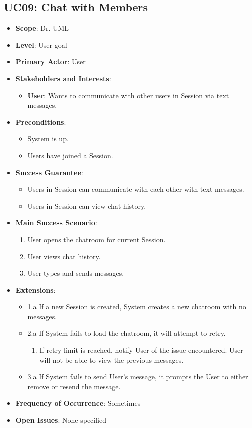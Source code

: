 \documentclass[12pt]{article}
\begin{document}
\subsection{UC09: Chat with Members}
\begin{itemize}
    \item \textbf{Scope}: Dr. UML
    \item \textbf{Level}: User goal
    \item \textbf{Primary Actor}: User
    \item \textbf{Stakeholders and Interests}:
    \begin{itemize}
        \item \textbf{User}: Wants to communicate with other users in Session via text messages.
    \end{itemize}
    \item \textbf{Preconditions}:
    \begin{itemize}
        \item System is up.
        \item Users have joined a Session.
    \end{itemize}
    \item \textbf{Success Guarantee}:
    \begin{itemize}
        \item Users in Session can communicate with each other with text messages.
        \item Users in Session can view chat history.
    \end{itemize}
    \item \textbf{Main Success Scenario}:
    \begin{enumerate}
        \item User opens the chatroom for current Session.
        \item User views chat history.
        \item User types and sends messages.
    \end{enumerate}
    \item \textbf{Extensions}:
    \begin{itemize}
        \item 1.a If a new Session is created, System creates a new chatroom with no messages.
        \item 2.a If System fails to load the chatroom, it will attempt to retry.
        \begin{enumerate}
            \item If retry limit is reached, notify User of the issue encountered. User will not be able to view the previous messages.
        \end{enumerate}
        \item 3.a If System fails to send User's message, it prompts the User to either remove or resend the message.
    \end{itemize}
    \item \textbf{Frequency of Occurrence}: Sometimes
    \item \textbf{Open Issues}: None specified
\end{itemize}
\end{document}

